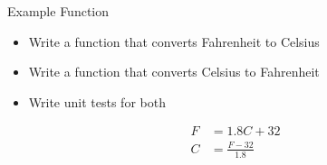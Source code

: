 \documentclass[11pt,professionalfonts]{beamer}
\begin{document}
\begin{frame}{Example Function}
    \begin{itemize}
        \item Write a function that converts Fahrenheit to Celsius
        \item Write a function that converts Celsius to Fahrenheit
        \item Write unit tests for both
    \end{itemize}

    \begin{align}
        F &= 1.8 C + 32 \\
        C &= \frac{F - 32}{1.8}
    \end{align}
\end{frame}
\end{document}
